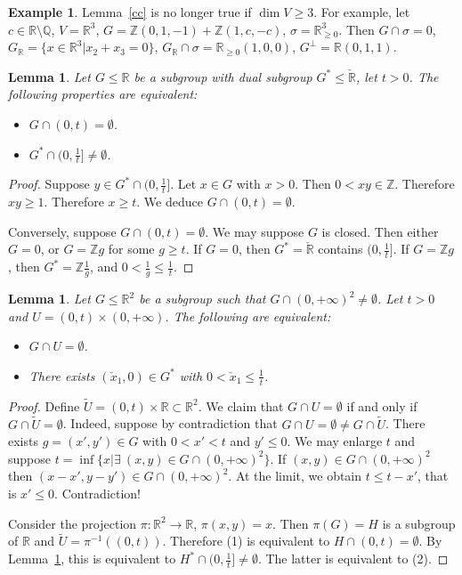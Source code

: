 \documentclass[12pt,reqno]{amsart}
\newcommand{\Q}{{\mathbb Q}}
\newcommand{\Z}{{\mathbb Z}}
\newcommand{\R}{{\mathbb R}}
\theoremstyle{plain}
\newtheorem{lem}[thm]{Lemma}
\theoremstyle{definition}
\newtheorem{exmp}[thm]{Example}
\theoremstyle{remark}
\begin{document}
\begin{exmp} Lemma~\ref{cc} is no longer true if $\dim V\ge 3$.
	For example, let $c\in \R\setminus \Q$, $V=\R^3$, $G=\Z(0,1,-1)+\Z(1,c,-c)$, $\sigma=\R^3_{\ge 0}$. Then $G\cap \sigma=0$,  $G_\R=\{x\in \R^3\vert x_2+x_3=0\}$, $G_\R\cap \sigma=\R_{\ge 0}(1,0,0)$, $G^\perp=\R(0,1,1)$.
\end{exmp}

\begin{lem}\label{d1}
	Let $G\le \R$ be a subgroup with dual subgroup $G^*\le \check{\R}$,
	let $t>0$. The following properties are equivalent:
	\begin{itemize}
		\item[(1)] $G\cap (0,t)=\emptyset$.
		\item[(2)] $G^*\cap (0,\frac{1}{t}]\ne \emptyset$.
	\end{itemize}
\end{lem}

\begin{proof} 
	Suppose $y\in G^*\cap (0,\frac{1}{t}]$. Let $x\in G$ with $x>0$.
	Then $0<xy\in \Z$. Therefore $xy\ge 1$. Therefore $x\ge t$. We deduce $G\cap (0,t)=\emptyset$.
	
	Conversely, suppose $G\cap (0,t)=\emptyset$. We may suppose $G$ is closed. Then either $G=0$, or $G=\Z g$ for some $g\ge t$. If $G=0$,
	then $G^*=\check{\R}$ contains $(0,\frac{1}{t}]$. If $G=\Z g$, then 
	$G^*=\Z \frac{1}{g}$, and $0<\frac{1}{g}\le \frac{1}{t}$.	
\end{proof}

\begin{lem}\label{d0} Let $G\le \R^2$
be a subgroup such that $G\cap (0,+\infty)^2\ne \emptyset$. Let $t>0$ and $U=(0,t)\times (0,+\infty)$.
The following are equivalent:
\begin{itemize}
\item[(1)] $G\cap U=\emptyset$.
\item[(2)] There exists $(\check{x}_1,0)\in G^*$ with $0<\check{x}_1\le\frac{1}{t}$.
\end{itemize}
\end{lem}

\begin{proof} Define $\tilde{U}=(0,t)\times \R \subset \R^2$. We claim that 
$G\cap U=\emptyset$ if and only if $G\cap \tilde{U}=\emptyset$. Indeed,
suppose by contradiction that $G\cap U=\emptyset\ne G\cap \tilde{U}$. There exists $g=(x',y')\in G$ with $0<x'<t$ and $y'\le 0$. We may enlarge $t$ and suppose $t=\inf\{x \vert \exists \ (x,y)\in G\cap (0,+\infty)^2\}$.
If $(x,y)\in G\cap (0,+\infty)^2$ then
$(x-x',y-y')\in G\cap (0,+\infty)^2$. At the limit, we obtain 
$t\le t-x'$, that is $x'\le 0$. Contradiction!

Consider the projection $\pi\colon \R^2\to \R$, $\pi(x,y)=x$.
Then $\pi(G)=H$ is a subgroup of $\R$ and $\tilde{U}=\pi^{-1}((0,t))$.
Therefore (1) is equivalent to
$H\cap (0,t)=\emptyset$. By Lemma~\ref{d1}, this is equivalent to
$H^*\cap (0,\frac{1}{t}]\ne \emptyset$. The latter is equivalent to (2).
\end{proof}
\end{document}
